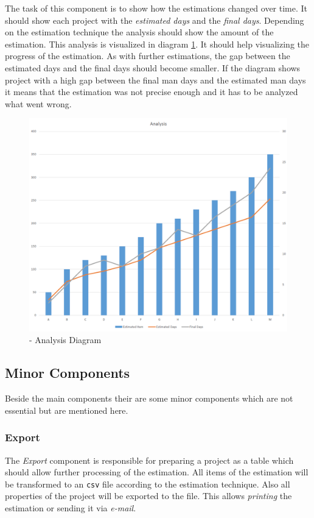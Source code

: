 The task of this component is to show how the estimations changed over time. It should show each project with the \textit{estimated days} and the \textit{final days}. Depending on the estimation technique the analysis should show the amount of the estimation. This analysis is visualized in diagram \ref{fig:analysis}. It should help visualizing the progress of the estimation. As with further estimations, the gap between the estimated days and the final days should become smaller. If the diagram shows project with a high gap between the final man days and the estimated man days it means that the estimation was not precise enough and it has to be analyzed what went wrong.
\begin{figure}[h] 
	\centering 
	\includegraphics[width=12cm]{images/analysis.png} 
	\caption{- Analysis Diagram} 
	\label{fig:analysis}
\end{figure}

\subsection{Minor Components}

Beside the main components their are some minor components which are not essential but are mentioned here.

\subsubsection{\textbf{Export}}

The \textit{Export} component is responsible for preparing a project as a table which should allow further processing of the estimation. All items of the estimation will be transformed to an \texttt{csv} file according to the estimation technique. Also all properties of the project will be exported to the file. This allows \textit{printing} the estimation or sending it via \textit{e-mail}.

